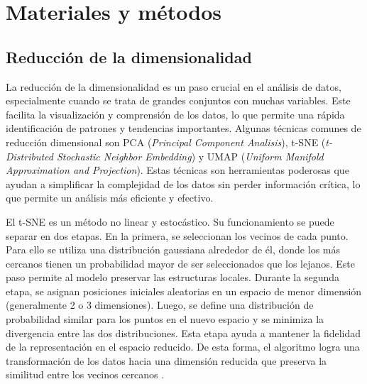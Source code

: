 \chapter{Materiales y métodos}
\label{cap1}
\section{Reducción de la dimensionalidad}
\label{c11}
\onehalfspacing


La reducción de la dimensionalidad es un paso crucial en el análisis de datos, especialmente cuando se trata de grandes conjuntos con muchas variables. Este facilita la visualización y comprensión de los datos, lo que permite una rápida identificación de patrones y tendencias importantes. Algunas técnicas comunes de reducción dimensional son PCA (\textit{Principal Component Analisis}), t-SNE (\textit{t-Distributed Stochastic Neighbor Embedding}) y UMAP (\textit{Uniform Manifold Approximation and Projection}). Estas técnicas son herramientas poderosas que ayudan a simplificar la complejidad de los datos sin perder información crítica, lo que permite un análisis más eficiente y efectivo.

El t-SNE es un método no linear y estocástico. Su funcionamiento se puede separar en dos etapas. En la primera, se seleccionan los vecinos de cada punto. Para ello se utiliza una distribución gaussiana alrededor de él, donde los más cercanos tienen un probabilidad mayor de ser seleccionados que los lejanos. Este paso permite al modelo preservar las estructuras locales. Durante la segunda etapa, se asignan posiciones iniciales aleatorias en un espacio de menor dimensión (generalmente 2 o 3 dimensiones). Luego, se define una distribución de probabilidad similar para los puntos en el nuevo espacio y se minimiza la divergencia entre las dos distribuciones. Esta etapa ayuda a mantener la fidelidad de la representación en el espacio reducido. De esta forma, el algoritmo logra una transformación de los datos hacia una dimensión reducida que preserva la similitud entre los vecinos cercanos \cite{Maaten2008, Jung_2024}.

